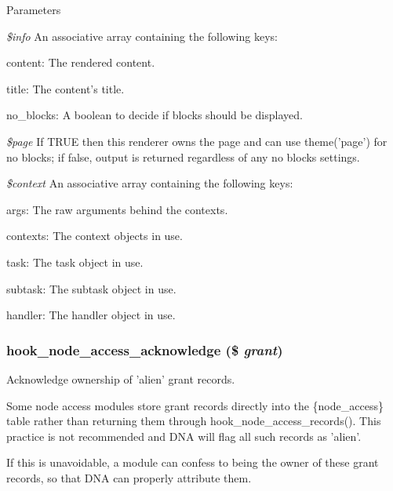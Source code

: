 \begin{DoxyParams}{Parameters}
\item[{\em \$info}]An associative array containing the following keys:
\begin{DoxyItemize}
\item content: The rendered content.
\item title: The content's title.
\item no\_\-blocks: A boolean to decide if blocks should be displayed. 
\end{DoxyItemize}\item[{\em \$page}]If TRUE then this renderer owns the page and can use theme('page') for no blocks; if false, output is returned regardless of any no blocks settings. \item[{\em \$context}]An associative array containing the following keys:
\begin{DoxyItemize}
\item args: The raw arguments behind the contexts.
\item contexts: The context objects in use.
\item task: The task object in use.
\item subtask: The subtask object in use.
\item handler: The handler object in use. 
\end{DoxyItemize}\end{DoxyParams}
\hypertarget{group__hooks_gac5a197ac3564b867c2921fb496063ae6}{
\subsubsection[{hook\_\-node\_\-access\_\-acknowledge}]{\setlength{\rightskip}{0pt plus 5cm}hook\_\-node\_\-access\_\-acknowledge (\$ {\em grant})}}
\label{group__hooks_gac5a197ac3564b867c2921fb496063ae6}
Acknowledge ownership of 'alien' grant records.

Some node access modules store grant records directly into the \{node\_\-access\} table rather than returning them through hook\_\-node\_\-access\_\-records(). This practice is not recommended and DNA will flag all such records as 'alien'.

If this is unavoidable, a module can confess to being the owner of these grant records, so that DNA can properly attribute them.

